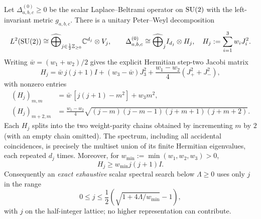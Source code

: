 \documentclass[11pt]{article}
\begin{document}
\begin{theorem}
\label{p1:thm:general-left-invariant-scalar-spectrum}
Let $\Delta^{(0)}_{a,b,c}\ge0$ be the scalar Laplace--Beltrami operator
on $\mathrm{SU}(2)$ with the left-invariant metric $g_{a,b,c}$.  There is a
unitary Peter--Weyl decomposition
\begin{equation}\label{p1:eq:general-scalar-blocks}
 L^2(\mathrm{SU}(2))\cong\widehat{\bigoplus}_{j\in\frac12\mathbb Z_{\ge0}}
       \mathbb C^{d_j}\otimes V_j,
 \qquad
 \Delta^{(0)}_{a,b,c}\cong\widehat{\bigoplus}_{j}
       I_{d_j}\otimes H_j,
 \quad H_j:=\sum_{i=1}^3 w_iJ_i^2.
\end{equation}
Writing $\bar w=(w_1+w_2)/2$ gives the explicit Hermitian
step-two Jacobi matrix
\begin{equation}\label{p1:eq:general-tridiagonal}
 H_j=\bar w\,j(j+1)I+(w_3-\bar w)J_3^2
       +\frac{w_1-w_2}{4}(J_+^2+J_-^2),
\end{equation}
with nonzero entries
\[
\begin{split}
 (H_j)_{m,m}&=\bar w\,[j(j+1)-m^2]+w_3m^2,\\
 (H_j)_{m+2,m}&=\frac{w_1-w_2}{4}
  \sqrt{(j-m)(j-m-1)(j+m+1)(j+m+2)}.
\end{split}
\]
Each $H_j$ splits into the two weight-parity chains obtained by incrementing
$m$ by $2$ (with an empty chain omitted).  The spectrum, including all
accidental coincidences, is precisely the multiset union of its finite
Hermitian eigenvalues, each repeated $d_j$ times.  Moreover, for
$w_{\min}:=\min(w_1,w_2,w_3)>0$,
\begin{equation}\label{p1:eq:general-scalar-band-cutoff}
 H_j\ge w_{\min}j(j+1)I.
\end{equation}
Consequently an \emph{exact exhaustive} scalar spectral search below
$\Lambda\ge0$ uses only $j$ in the range
\[
 0\le j\le\frac12(\sqrt{1+4\Lambda/w_{\min}}-1),
\]
with $j$ on the half-integer lattice; no higher representation can contribute.
\end{theorem}
\end{document}
